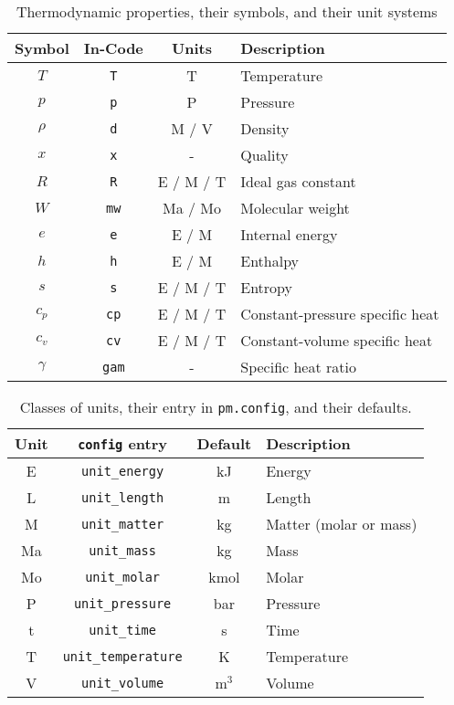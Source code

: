 \begin{table}
\centering
\caption{Thermodynamic properties, their symbols, and their unit systems}\label{tab:properties}
\begin{tabular}{cccl}
\hline
Symbol & In-Code & Units & Description\\
\hline
$T$ & \verb|T| & T & Temperature\\
$p$ & \verb|p| & P & Pressure\\
$\rho$ & \verb|d| & M / V & Density\\
$x$ & \verb|x| & - & Quality\\
\hline
$R$ & \verb|R| & E / M / T & Ideal gas constant\\
$W$ & \verb|mw| & Ma / Mo & Molecular weight\\
\hline
$e$ & \verb|e| & E / M & Internal energy\\
$h$ & \verb|h| & E / M & Enthalpy\\
$s$ & \verb|s| & E / M / T & Entropy\\
\hline
$c_p$ & \verb|cp| & E / M / T & Constant-pressure specific heat\\
$c_v$ & \verb|cv| & E / M / T & Constant-volume specific heat\\
$\gamma$ & \verb|gam| & - & Specific heat ratio\\
\hline
\end{tabular}
\end{table}

\begin{table}
\centering
\caption{Classes of units, their entry in \texttt{pm.config}, and their defaults.}\label{tab:units}
\begin{tabular}{|cccl|}
\hline
Unit & \verb|config| entry & Default & Description\\
\hline
E & \verb|unit_energy| & kJ & Energy\\
L & \verb|unit_length| & m & Length\\
M & \verb|unit_matter| & kg & Matter (molar or mass)\\
Ma & \verb|unit_mass| & kg & Mass\\
Mo & \verb|unit_molar| & kmol & Molar\\
P & \verb|unit_pressure| & bar & Pressure\\
t & \verb|unit_time| & s & Time\\
T & \verb|unit_temperature| & K & Temperature\\
V & \verb|unit_volume| & m$^3$ & Volume\\
\hline
\end{tabular}
\end{table}

